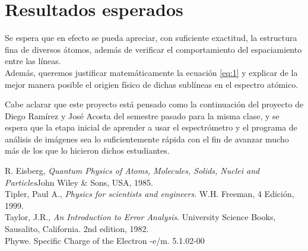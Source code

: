 \documentclass[prb,aps,twocolumn,preprintnumbers,amsmath,amssymb]{revtex4}
\begin{document}
\section{Resultados esperados}

Se espera que en efecto se pueda apreciar, con suficiente exactitud, la estructura fina de diversos átomos, además de verificar el comportamiento del espaciamiento entre las líneas. \\

Además, queremos justificar matemáticamente la ecuación \ref{eq:1} y explicar de la mejor manera posible el origien físico de dichas sublíneas en el espectro atómico.

Cabe aclarar que este proyecto está pensado como la continuación del proyecto de Diego Ramírez y José Acosta del semestre pasado para la misma clase, y se espera que la etapa inicial de aprender a usar el espectrómetro y el programa de análisis de imágenes sea lo suficientemente rápida con el fin de avanzar mucho más de los que lo hicieron dichos estudiantes. \\

\begin{thebibliography}{99}
 R. Eisberg, {\it Quantum Physics of Atoms, Molecules, Solids, Nuclei and Particles}{John Wiley \& Sons, USA, 1985}.\\

 Tipler, Paul A., \textit{Physics for scientists and engineers}. W.H. Freeman, 4 Edici\' on, 1999.\\

 Taylor, J.R., \textit{An Introduction to Error Analysis}. University Science Books, Sausalito, California. 2nd edition, 1982.\\

 Phywe. Specific Charge of the Electron -e/m. 5.1.02-00\\
\end{thebibliography}
\end{document}
